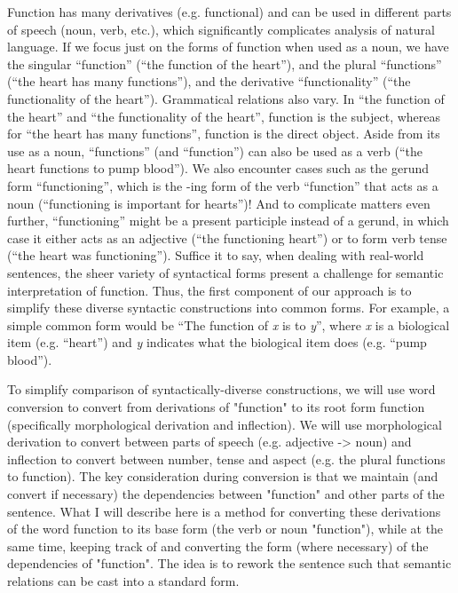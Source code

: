 \documentclass{article}
\begin{document}
Function has many derivatives (e.g. functional) and can be used in different parts of speech (noun, verb, etc.), which significantly complicates analysis of natural language.
If we focus just on the forms of function when used as a noun, we have the singular ``function'' (``the function of the heart''), and the plural ``functions'' (``the heart has many functions''), and the derivative ``functionality'' (``the functionality of the heart'').
Grammatical relations also vary.
In ``the function of the heart'' and ``the functionality of the heart'', function is the subject, whereas for ``the heart has many functions'', function is the direct object.
Aside from its use as a noun, ``functions'' (and ``function'') can also be used as a verb (``the heart functions to pump blood'').
We also encounter cases such as the gerund form ``functioning'', which is the -ing form of the verb ``function'' that acts as a noun (``functioning is important for hearts'')!
And to complicate matters even further, ``functioning'' might be a present participle instead of a gerund, in which case it either acts as an adjective (``the functioning heart'') or to form verb tense (``the heart was functioning''). Suffice it to say, when dealing with real-world sentences, the sheer variety of syntactical forms present a challenge for semantic interpretation of function.
Thus, the first component of our approach is to simplify these diverse syntactic constructions into common forms.
For example, a simple common form would be ``The function of \emph{x} is to \emph{y}'', where \emph{x} is a biological item (e.g. ``heart'') and \emph{y} indicates what the biological item does (e.g. ``pump blood'').




To simplify comparison of syntactically-diverse constructions, we will use word conversion to convert from derivations of "function" to its root form function (specifically morphological derivation and inflection). We will use morphological derivation to convert between parts of speech (e.g. adjective -> noun) and inflection to convert between number, tense and aspect (e.g. the plural functions to function). The key consideration during conversion is that we maintain (and convert if necessary) the dependencies between "function" and other parts of the sentence. What I will describe here is a method for converting these derivations of the word function to its base form (the verb or noun "function"), while at the same time, keeping track of and converting the form (where necessary) of the dependencies of "function". The idea is to rework the sentence such that semantic relations can be cast into a standard form.
\end{document}
